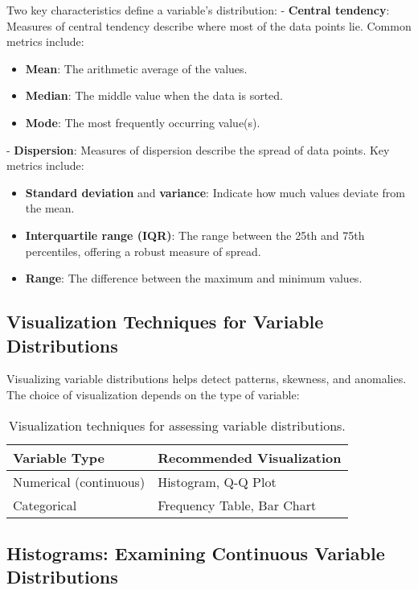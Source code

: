 \documentclass[12pt,openany]{book}
\begin{document}
Two key characteristics define a variable’s distribution:  
- \textbf{Central tendency}: Measures of central tendency describe where most of the data points lie. Common metrics include:
  \begin{itemize}
      \item \textbf{Mean}: The arithmetic average of the values.
      \item \textbf{Median}: The middle value when the data is sorted.
      \item \textbf{Mode}: The most frequently occurring value(s).
  \end{itemize}
- \textbf{Dispersion}: Measures of dispersion describe the spread of data points. Key metrics include:
  \begin{itemize}
      \item \textbf{Standard deviation} and \textbf{variance}: Indicate how much values deviate from the mean.
      \item \textbf{Interquartile range (IQR)}: The range between the 25th and 75th percentiles, offering a robust measure of spread.
      \item \textbf{Range}: The difference between the maximum and minimum values.
  \end{itemize}

\subsection{Visualization Techniques for Variable Distributions}

Visualizing variable distributions helps detect patterns, skewness, and anomalies. The choice of visualization depends on the type of variable:

\begin{table}[h]
    \centering
    \begin{tabular}{|l|l|}
        \hline
        \textbf{Variable Type} & \textbf{Recommended Visualization} \\
        \hline
        Numerical (continuous) & Histogram, Q-Q Plot \\
        Categorical & Frequency Table, Bar Chart \\
        \hline
    \end{tabular}
    \caption{Visualization techniques for assessing variable distributions.}
    \label{tab:viz_variable_distributions}
\end{table}

\subsection{Histograms: Examining Continuous Variable Distributions}
\end{document}
